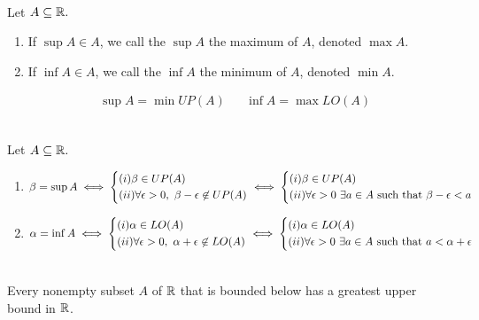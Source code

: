 \begin{definition} \leavevmode \\
    Let $A \subseteq \mathbb{R}.$

    \begin{enumerate}[$*)$]
        \item If $\sup A\in A$, we call the $\sup A$ the maximum of $A$, denoted $\max A$.
        \item If $\inf A\in A$, we call the $\inf A$ the minimum of $A$, denoted $\min A$.
    \end{enumerate}
    \begin{align*}
        &\sup A = \min UP(A) &&\inf A = \max LO(A)
    \end{align*}
\end{definition}

\begin{fact} \leavevmode \\
    Let $A \subseteq \mathbb{R}.$
    \begin{enumerate}[1.]
        \item $\beta = \sup A \iff
        \begin{cases*}
            (i) \beta \in UP(A) \\
            (ii) \forall \epsilon > 0, ~\beta - \epsilon \not \in UP(A)
        \end{cases*} \iff
        \begin{cases*}
            (i) \beta \in UP(A) \\
            (ii) \forall \epsilon > 0 ~\exists a \in A \st \beta - \epsilon < a
        \end{cases*}$

        \item $\alpha = \inf A \iff
        \begin{cases*}
            (i) \alpha \in LO(A) \\
            (ii) \forall \epsilon > 0, ~\alpha + \epsilon \not \in LO(A)
        \end{cases*} \iff
        \begin{cases*}
            (i) \alpha \in LO(A) \\
            (ii) \forall \epsilon > 0 ~\exists a \in A \st a < \alpha + \epsilon
        \end{cases*}$
    \end{enumerate}
\end{fact}

\begin{theorem} \leavevmode \\
    Every nonempty subset $A$ of $\mathbb{R}$ that is bounded below has a greatest upper bound in $\mathbb{R}$.
\end{theorem}


